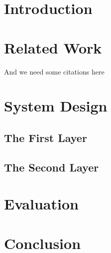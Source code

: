 \section{Introduction}
\Blindtext


\section{Related Work}
\blindtext

And we need some citations here\cite{einstein, knuthwebsite}

\Blindtext

\section{System Design}

\subsection{The First Layer}
\Blindtext

\subsection{The Second Layer}
\Blindtext

\section{Evaluation}
\Blindtext

\section{Conclusion}
\blindtext


